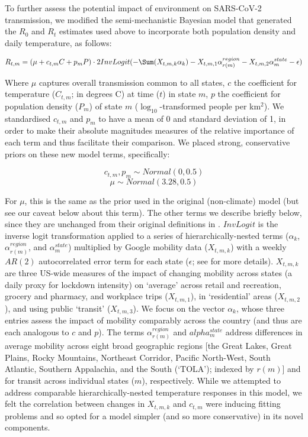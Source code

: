 \documentclass[12pt,english,a4paper]{article}
\newcommand{\virus}{SARS-CoV-2\xspace}
\newcommand{\RO}{$R_0$\xspace}
\begin{document}
To further assess the potential impact of environment on \virus transmission, we modified the semi-mechanistic Bayesian model \cite{Unwin2020a} that generated the \RO and $R_t$ estimates used above to incorporate both population density and daily temperature, as follows:

\begin{equation}
    R_{t,m} = (\mu + c_{t,m}C + p_mP) \cdot 2 InvLogit(-\Sum(X_{t,m,k}\alpha_k) -X_{t,m,1}\alpha_{r(m)}^{region} -X_{t,m,2}\alpha_m^{state} - \epsilon)
    \label{eq:Rt}
\end{equation}

Where $\mu$ captures overall transmission common to all states, $c$ the coefficient for temperature ($C_{t,m}$; in degrees C) at time ($t$) in state $m$, $p$ the coefficient for  population density ($P_m$) of state $m$ ($\log_{10}$-transformed people per km$^2$). 
We standardised $c_{t,m}$ and $p_m$ to have a mean of 0 and standard deviation of 1, in order to make their absolute magnitudes measures of the relative importance of each term and thus facilitate their comparison.
We placed strong, conservative priors on these new model terms, specifically:

\begin{equation}
    c_{t,m}, p_m \sim Normal(0, 0.5)
\end{equation}
\begin{equation}
    \mu \sim Normal(3.28, 0.5) 
\end{equation}


For $\mu$, this is the same as the prior used in the original (non-climate) model\cite{Unwin2020a} (but see our caveat below about this term). The other terms we describe briefly below, since they are unchanged from their original definitions in \citet{Unwin2020a}. $InvLogit$ is the inverse logit transformation applied to a series of hierarchically-nested terms ($\alpha_k$, $\alpha_{r(m)}^{region}$, and $\alpha_m^{state}$) multiplied by Google mobility data \cite{Aktay2020} ($X_{t,m,k}$) with a weekly $AR(2)$ autocorrelated error term for each state ($\epsilon$; see \citet{Unwin2020a} for more details). $X_{t,m,k}$ are three US-wide measures of the impact of changing mobility across states (a daily proxy for lockdown intensity) on `average' across retail and recreation, grocery and pharmacy, and workplace trips ($X_{t,m,1}$), in `residential' areas ($X_{t,m,2}$), and using public `transit' ($X_{t,m,3}$).
We focus on the vector $\alpha_k$, whose three entries assess the impact of mobility comparably across the country (and thus are each analogous to $c$ and $p$). The terms $\alpha_{r(m)}^{region}$ and $alpha_m^{state}$ address differences in average mobility across eight broad geographic regions [the Great Lakes, Great Plains, Rocky Mountains, Northeast Corridor, Pacific North-West, South Atlantic, Southern Appalachia, and the South (`TOLA'); indexed by $r(m)$] and for transit across individual states ($m$), respectively.
While we attempted to address comparable hierarchically-nested temperature responses in this model, we felt the correlation between changes in $X_{t,m,k}$ and $c_{t,m}$ were inducing fitting problems and so opted for a model simpler (and so more conservative) in its novel components.
\end{document}
